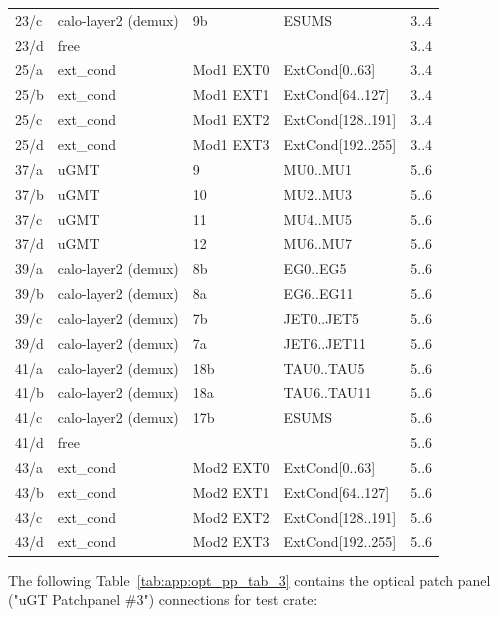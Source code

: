 \begin{longtable}{|l|l|l|l|c|}
23/c & calo-layer2 (demux) & 9b  & ESUMS & 3..4\\          
23/d & free &  &  & 3..4\\
25/a & ext\_cond & Mod1 EXT0 & ExtCond[0..63] & 3..4 \\
25/b & ext\_cond & Mod1 EXT1 & ExtCond[64..127] & 3..4\\
25/c & ext\_cond & Mod1 EXT2 & ExtCond[128..191] & 3..4\\
25/d & ext\_cond & Mod1 EXT3 & ExtCond[192..255] & 3..4\\\hline
37/a & uGMT & 9  & MU0..MU1 & 5..6\\
37/b & uGMT & 10 & MU2..MU3 & 5..6\\
37/c & uGMT & 11 & MU4..MU5 & 5..6\\
37/d & uGMT & 12 & MU6..MU7 & 5..6\\
39/a & calo-layer2 (demux) & 8b & EG0..EG5 & 5..6\\
39/b & calo-layer2 (demux) & 8a & EG6..EG11 & 5..6\\
39/c & calo-layer2 (demux) & 7b & JET0..JET5 & 5..6\\
39/d & calo-layer2 (demux) & 7a & JET6..JET11 & 5..6\\
41/a & calo-layer2 (demux) & 18b & TAU0..TAU5 & 5..6\\
41/b & calo-layer2 (demux) & 18a & TAU6..TAU11 & 5..6\\
41/c & calo-layer2 (demux) & 17b & ESUMS & 5..6\\
41/d & free &  &  & 5..6\\
43/a & ext\_cond & Mod2 EXT0 & ExtCond[0..63] & 5..6 \\
43/b & ext\_cond & Mod2 EXT1 & ExtCond[64..127] & 5..6\\
43/c & ext\_cond & Mod2 EXT2 & ExtCond[128..191] & 5..6\\
43/d & ext\_cond & Mod2 EXT3 & ExtCond[192..255] & 5..6\\\hline
\end{longtable}

The following Table~\ref{tab:app:opt_pp_tab_3} contains the optical patch panel ("uGT Patchpanel \#3") connections for test crate:

